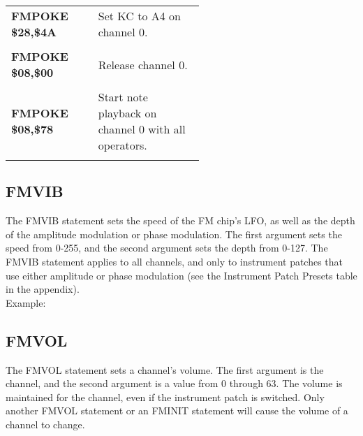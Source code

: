 \begin{tabular}{l p{0.55\linewidth}}

	{\ttfamily\bfseries FMPOKE \$28,\$4A}&Set {\ttfamily KC} to {\ttfamily A4} on channel 0.\\\\

	{\ttfamily\bfseries FMPOKE \$08,\$00}&Release channel 0.\\\\

	{\ttfamily\bfseries FMPOKE \$08,\$78}&Start note playback on channel 0 with all operators.\\\\

\end{tabular}

\subsection{FMVIB}

The {\ttfamily FMVIB} statement sets the speed of the FM chip's LFO, as well as
the depth of the amplitude modulation or phase modulation.  The first argument
sets the speed from 0-255, and the second argument sets the depth from 0-127.
The {\ttfamily FMVIB} statement applies to all channels, and only to instrument
patches that use either amplitude or phase modulation (see the Instrument Patch
Presets table in the appendix).\\

Example:\\


\subsection{FMVOL}

The {\ttfamily FMVOL} statement sets a channel's volume.  The first argument is
the channel, and the second argument is a value from 0 through 63.  The volume
is maintained for the channel, even if the instrument patch is switched.  Only
another {\ttfamily FMVOL} statement or an {\ttfamily FMINIT} statement will
cause the volume of a channel to change.\\

